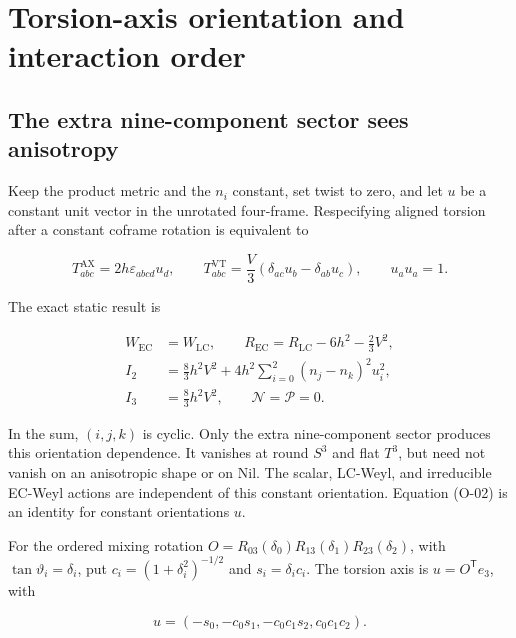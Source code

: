 \section{Torsion-axis orientation and interaction order}

\subsection{The extra nine-component sector sees anisotropy}

Keep the product metric and the $n_i$ constant, set twist to zero, and let $u$ be a constant unit vector in the unrotated four-frame. Respecifying aligned torsion after a constant coframe rotation is equivalent to

\begin{equation}\tag{O-01}\label{eq:O-01}
T^{\mathrm{AX}}_{abc}=2h\varepsilon_{abcd}u_d,\qquad
T^{\mathrm{VT}}_{abc}=\frac{V}{3}(\delta_{ac}u_b-\delta_{ab}u_c),\qquad
u_au_a=1.
\end{equation}

The exact static result is

\begin{equation}\tag{O-02}\label{eq:O-02}
\begin{aligned}
W_{\mathrm{EC}}&=W_{\mathrm{LC}},\qquad
R_{\mathrm{EC}}=R_{\mathrm{LC}}-6h^2-\frac23V^2,\\
I_2&=\frac83h^2V^2+4h^2\sum_{i=0}^2(n_j-n_k)^2u_i^2,\\
I_3&=\frac83h^2V^2,\qquad \mathcal N=\mathcal P=0.
\end{aligned}
\end{equation}

In the sum, $(i,j,k)$ is cyclic. Only the extra nine-component sector produces this orientation dependence. It vanishes at round $S^3$ and flat $T^3$, but need not vanish on an anisotropic shape or on Nil. The scalar, LC-Weyl, and irreducible EC-Weyl actions are independent of this constant orientation. Equation (O-02) is an identity for constant orientations $u$.

For the ordered mixing rotation $O=R_{03}(\delta_0)R_{13}(\delta_1)R_{23}(\delta_2)$, with $\tan\vartheta_i=\delta_i$, put $c_i=(1+\delta_i^2)^{-1/2}$ and $s_i=\delta_i c_i$. The torsion axis is $u=O^{\mathsf T}e_3$, with

\begin{equation}\tag{O-03}\label{eq:O-03}
u=(-s_0,-c_0s_1,-c_0c_1s_2,c_0c_1c_2).
\end{equation}

